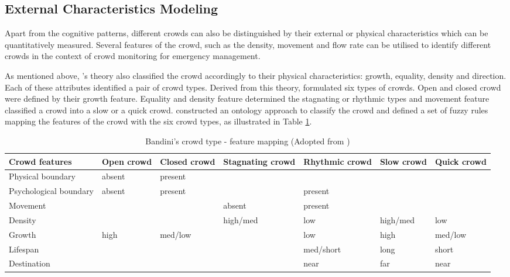 \subsection{External Characteristics Modeling}

Apart from the cognitive patterns, different crowds can also be distinguished by their external or physical characteristics which can be quantitatively measured. Several features of the crowd, such as the density, movement and flow rate can be utilised to identify different crowds in the context of crowd monitoring for emergency management.

As mentioned above, \citet{Canetti1962}’s theory also classified the crowd accordingly to their physical characteristics: growth, equality, density and direction. Each of these attributes identified a pair of crowd types. Derived from this theory, \citet{Bandini2011} formulated six types of crowds. Open and closed crowd were defined by their growth feature. Equality and density feature determined the stagnating or rhythmic types and movement feature classified a crowd into a slow or a quick crowd. \citet{Bandini2011} constructed an ontology approach to classify the crowd and defined a set of fuzzy rules mapping the features of the crowd with the six crowd types, as illustrated in Table \ref{table:bandiniCrowdType}.

\begin{table}[!htbp]
	\caption{Bandini's crowd type - feature mapping (Adopted from \citet{Bandini2011})}
	\label{table:bandiniCrowdType}
	\centering
	\begin{tabular}{|p{2.5cm}|p{1.5cm}|p{1.5cm}|p{2cm}|p{2cm}|p{1.5cm}|p{1.5cm}|}
		\hline
		\textbf{Crowd features} & \textbf{Open crowd} & \textbf{Closed crowd} & \textbf{Stagnating crowd} & \textbf{Rhythmic crowd} & \textbf{Slow crowd} & \textbf{Quick crowd} \\ \hline \hline
		Physical boundary & absent & present & & & & \\ \hline
		Psychological boundary & absent & present & & present & & \\ \hline
		Movement & & & absent & present & & \\ \hline
		Density & & & high/med & low & high/med & low \\ \hline
		Growth & high & med/low & & low & high & med/low \\ \hline
		Lifespan & & & & med/short & long & short \\ \hline
		Destination & & & & near & far & near \\ \hline
	\end{tabular}
\end{table}

